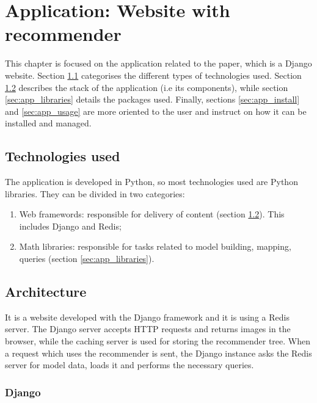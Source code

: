 \chapter{Application: Website with recommender}
\label{chap:app}

This chapter is focused on the application related to the paper, which is a Django website. Section \ref{sec:app_technology} categorises the different types of technologies used. Section \ref{sec:app_architecture} describes the stack of the application (i.e its components), while section \ref{sec:app_libraries} details the packages used. Finally, sections \ref{sec:app_install} and \ref{sec:app_usage} are more oriented to the user and instruct on how it can be installed and managed.

\section{Technologies used}
\label{sec:app_technology}

The application is developed in Python, so most technologies used are Python libraries. They can be divided in two categories:

\begin{enumerate}
\item{Web framewords: responsible for delivery of content (section \ref{sec:app_architecture}). This includes Django and Redis;}
\item{Math libraries: responsible for tasks related to model building, mapping, queries (section \ref{sec:app_libraries}).}
\end{enumerate}

\section{Architecture}
\label{sec:app_architecture}

It is a website developed with the Django framework and it is using a Redis server. The Django server accepts HTTP requests and returns images in the browser, while the caching server is used for storing the recommender tree. When a request which uses the recommender is sent, the Django instance asks the Redis server for model data, loads it and performs the necessary queries.

\subsection{Django}
\label{subsec:app_architecture_django}

